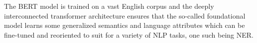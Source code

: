 









The BERT model is trained on a vast English corpus and the deeply interconnected transformer architecture ensures that the so-called foundational model learns some generalized semantics and language attributes which can be fine-tuned and reoriented to suit for a variety of NLP tasks, one such being NER.

